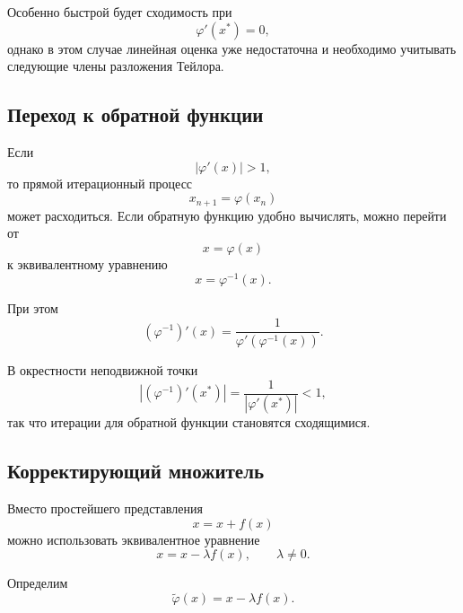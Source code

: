 \documentclass[../final.tex]{subfiles}
\begin{document}
Особенно быстрой будет сходимость при
%
\begin{equation*}
    \varphi'(x^*)=0,
\end{equation*}
%
однако в этом случае линейная оценка уже недостаточна и необходимо
учитывать следующие члены разложения Тейлора.


\subsection{Переход к обратной функции}

Если
%
\begin{equation*}
    |\varphi'(x)|>1,
\end{equation*}
%
то прямой итерационный процесс
%
\begin{equation*}
    x_{n+1}=\varphi(x_n)
\end{equation*}
%
может расходиться. Если обратную функцию удобно вычислять, можно
перейти от
%
\begin{equation*}
    x=\varphi(x)
\end{equation*}
%
к эквивалентному уравнению
%
\begin{equation*}
    x=\varphi^{-1}(x).
\end{equation*}

При этом
%
\begin{equation*}
    (\varphi^{-1})'(x)
    =
    \frac{1}{\varphi'(\varphi^{-1}(x))}.
\end{equation*}

В окрестности неподвижной точки
%
\begin{equation*}
    |(\varphi^{-1})'(x^*)|
    =
    \frac{1}{|\varphi'(x^*)|}
    <1,
\end{equation*}
%
так что итерации для обратной функции становятся сходящимися.


\subsection{Корректирующий множитель}

Вместо простейшего представления
%
\begin{equation*}
    x=x+f(x)
\end{equation*}
%
можно использовать эквивалентное уравнение
%
\begin{equation*}
    x=x-\lambda f(x),
    \qquad
    \lambda\neq0.
\end{equation*}

Определим
%
\begin{equation*}
    \widetilde\varphi(x)
    =
    x-\lambda f(x).
\end{equation*}
\end{document}
